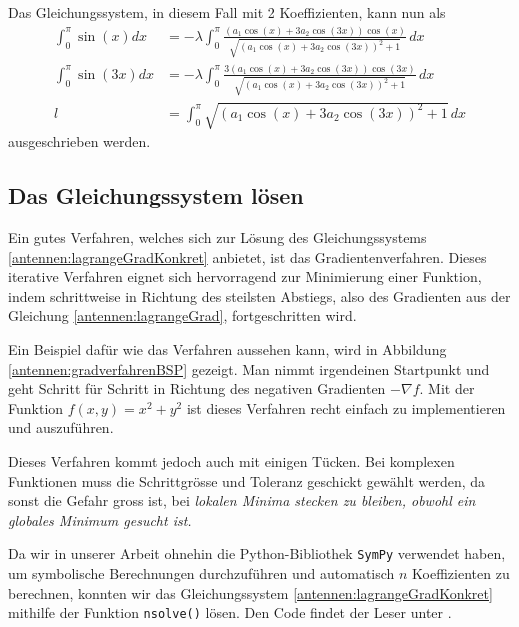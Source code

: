Das Gleichungssystem, in diesem Fall mit 
2 Koeffizienten, kann nun als
\begin{equation}
	\begin{aligned}
		\int_0^\pi \sin (x) dx
		&=
		-\lambda \int_0^\pi \frac{\left(a_1 \cos (x)+3 a_2 \cos (3 x)\right) 
			\cos (x)}{\sqrt{\left(a_1 \cos (x)+3 a_2 \cos (3 x)\right)^2+1}} \, dx \\
		\int_0^\pi \sin (3 x) dx
		&=
		-\lambda \int_0^\pi \frac{3\left(a_1 \cos (x)+3 a_2 \cos (3 x)\right) 
			\cos (3 x)}{\sqrt{\left(a_1 \cos (x)+3 a_2 \cos (3 x)\right)^2+1}} \, dx \\
		l
		&=
		\int_0^\pi \sqrt{\left(a_1 \cos (x)+3 a_2 \cos (3 x)\right)^2+1} \, dx
	\end{aligned}
	\label{antennen:lagrangeGradKonkret}
\end{equation}
ausgeschrieben werden. 

\subsection{Das Gleichungssystem lösen\label{antennen:glSysSolve}}

Ein gutes Verfahren, welches sich zur Lösung des Gleichungssystems 
\eqref{antennen:lagrangeGradKonkret} anbietet, ist das Gradientenverfahren. Dieses 
iterative Verfahren eignet sich hervorragend zur Minimierung 
einer Funktion, indem schrittweise in Richtung des steilsten Abstiegs,
also des Gradienten aus der Gleichung \eqref{antennen:lagrangeGrad},
fortgeschritten wird. 



Ein Beispiel dafür wie das Verfahren aussehen kann, wird in 
Abbildung \ref{antennen:gradverfahrenBSP} gezeigt. Man nimmt irgendeinen Startpunkt
und geht Schritt für Schritt in Richtung des negativen Gradienten $-\nabla f$.
Mit der Funktion $f(x,y)=x^2+y^2$ ist dieses Verfahren recht einfach zu 
implementieren und auszuführen.

Dieses Verfahren kommt jedoch auch mit einigen Tücken. Bei komplexen Funktionen muss die 
Schrittgrösse und Toleranz geschickt gewählt werden, da sonst die Gefahr gross ist,
bei \em lokalen \em Minima stecken zu bleiben, obwohl ein \em globales \em Minimum gesucht ist.

Da wir in unserer Arbeit ohnehin die Python-Bibliothek \texttt{SymPy} verwendet haben, 
%
um symbolische Berechnungen durchzuführen und automatisch $n$ Koeffizienten zu berechnen, 
konnten wir das Gleichungssystem \eqref{antennen:lagrangeGradKonkret} mithilfe der Funktion 
\texttt{nsolve()} lösen.
%
Den Code findet der Leser unter \cite{antennen:codeKoeff}.

